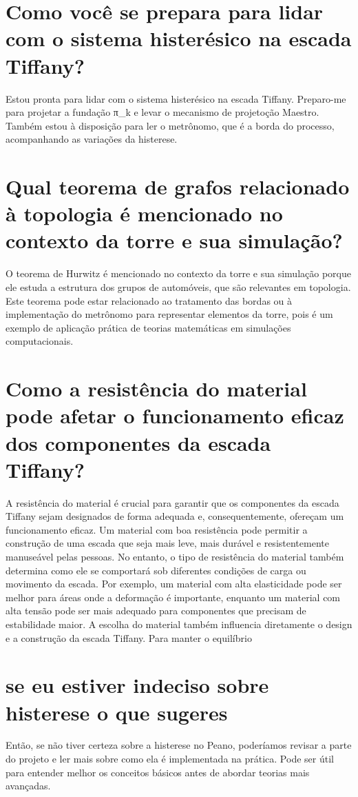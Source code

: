 \documentclass[11pt,a4paper]{article}
\begin{document}
\section{Como você se prepara para lidar com o sistema histerésico na escada Tiffany?}
Estou pronta para lidar com o sistema histerésico na escada Tiffany. Preparo-me para projetar a fundação π\_k e levar o mecanismo de projetoção Maestro. Também estou à disposição para ler o metrônomo, que é a borda do processo, acompanhando as variações da histerese.

\section{Qual teorema de grafos relacionado à topologia é mencionado no contexto da torre e sua simulação?}
O teorema de Hurwitz é mencionado no contexto da torre e sua simulação porque ele estuda a estrutura dos grupos de automóveis, que são relevantes em topologia. Este teorema pode estar relacionado ao tratamento das bordas ou à implementação do metrônomo para representar elementos da torre, pois é um exemplo de aplicação prática de teorias matemáticas em simulações computacionais.

\section{Como a resistência do material pode afetar o funcionamento eficaz dos componentes da escada Tiffany?}
A resistência do material é crucial para garantir que os componentes da escada Tiffany sejam designados de forma adequada e, consequentemente, ofereçam um funcionamento eficaz. Um material com boa resistência pode permitir a construção de uma escada que seja mais leve, mais durável e resistentemente manuseável pelas pessoas. No entanto, o tipo de resistência do material também determina como ele se comportará sob diferentes condições de carga ou movimento da escada. Por exemplo, um material com alta elasticidade pode ser melhor para áreas onde a deformação é importante, enquanto um material com alta tensão pode ser mais adequado para componentes que precisam de estabilidade maior. A escolha do material também influencia diretamente o design e a construção da escada Tiffany. Para manter o equilíbrio

\section{se eu estiver indeciso sobre histerese o que sugeres}
Então, se não tiver certeza sobre a histerese no Peano, poderíamos revisar a parte do projeto e ler mais sobre como ela é implementada na prática. Pode ser útil para entender melhor os conceitos básicos antes de abordar teorias mais avançadas.
\end{document}
